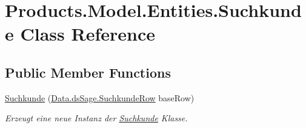 \hypertarget{class_products_1_1_model_1_1_entities_1_1_suchkunde}{}\section{Products.\+Model.\+Entities.\+Suchkunde Class Reference}
\label{class_products_1_1_model_1_1_entities_1_1_suchkunde}
\subsection*{Public Member Functions}
\begin{DoxyCompactItemize}
\item 
\hyperlink{class_products_1_1_model_1_1_entities_1_1_suchkunde_a8e5ac4c9feda8609c958685edd93adc7}{Suchkunde} (\hyperlink{class_products_1_1_data_1_1ds_sage_1_1_suchkunde_row}{Data.\+ds\+Sage.\+Suchkunde\+Row} base\+Row)
\begin{DoxyCompactList}\small\item\em Erzeugt eine neue Instanz der \hyperlink{class_products_1_1_model_1_1_entities_1_1_suchkunde}{Suchkunde} Klasse. \end{DoxyCompactList}\end{DoxyCompactItemize}
